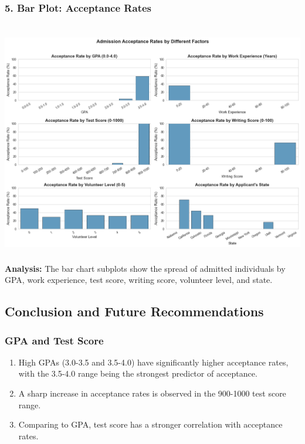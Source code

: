 \documentclass[
  letterpaper,
  DIV=11,
  numbers=noendperiod]{scrartcl}
\providecommand{\tightlist}{%
  \setlength{\itemsep}{0pt}\setlength{\parskip}{0pt}}\usepackage{longtable,booktabs,array}
\begin{document}
\subsubsection{5. Bar Plot: Acceptance
Rates}\label{bar-plot-acceptance-rates}

\section{\texorpdfstring{\protect\includegraphics{images/acceptance_rates_factors.png}}{}}\label{section}

\textbf{Analysis:} The bar chart subplots show the spread of admitted
individuals by GPA, work experience, test score, writing score,
volunteer level, and state.

\subsection{Conclusion and Future
Recommendations}\label{conclusion-and-future-recommendations}

\subsubsection{GPA and Test Score}\label{gpa-and-test-score}

\begin{enumerate}
\def\labelenumi{\arabic{enumi}.}
\tightlist
\item
  High GPAs (3.0-3.5 and 3.5-4.0) have significantly higher acceptance
  rates, with the 3.5-4.0 range being the strongest predictor of
  acceptance.
\item
  A sharp increase in acceptance rates is observed in the 900-1000 test
  score range.
\item
  Comparing to GPA, test score has a stronger correlation with
  acceptance rates.
\end{enumerate}
\end{document}
